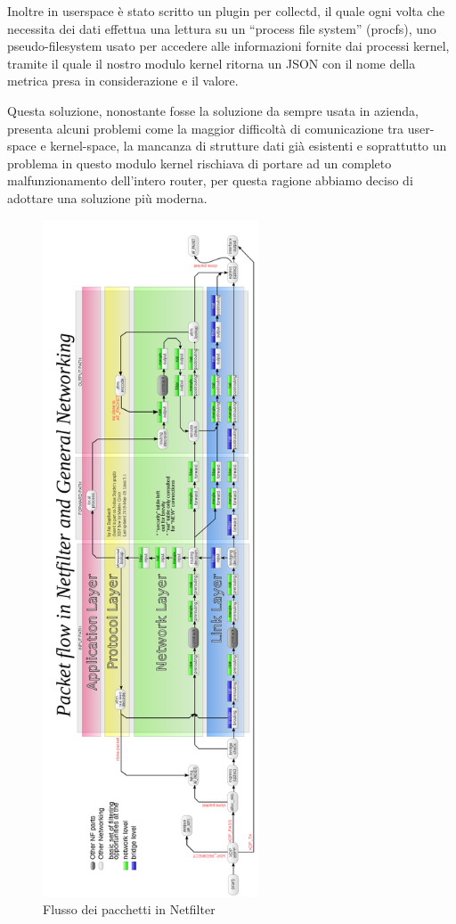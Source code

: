 Inoltre in userspace è stato scritto un plugin per collectd, il quale ogni volta che necessita dei dati effettua una lettura su un ``process file system'' (procfs), uno pseudo-filesystem usato per accedere alle informazioni fornite dai processi kernel, tramite il quale il nostro modulo kernel ritorna un JSON con il nome della metrica presa in considerazione e il valore.

Questa soluzione, nonostante fosse la soluzione da sempre usata in azienda, presenta alcuni problemi come la maggior difficoltà di comunicazione tra user-space e kernel-space, la mancanza di strutture dati già esistenti e soprattutto un problema in questo modulo kernel rischiava di portare ad un completo malfunzionamento dell'intero router, per questa ragione abbiamo deciso di adottare una soluzione più moderna.

\begin{figure}[hbtp]
    \label{fig:netfilter}
    \begin{center}
        \includegraphics[height=570pt]{images/mitigazione/netfilter.png}
    \end{center}

    \caption{Flusso dei pacchetti in Netfilter}
    \centering
\end{figure}  

